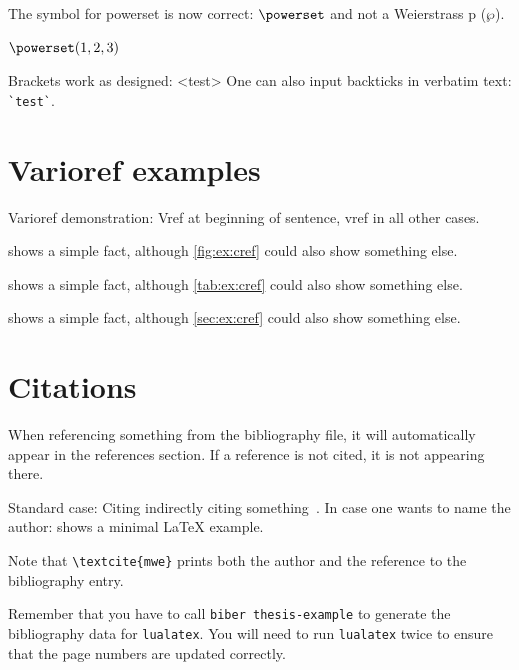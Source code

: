 \documentclass[
  fontsize=10pt,
  numbers=noenddot,
  english,  %
  paper=a5,
  twoside,  %
  DIV=calc,
  headings=small,
  bibliography=totoc,
  listof=totoc,
  draft=false
]{scrbook}
\theoremstyle{break}
\begin{document}
\begin{ltgexample}
The symbol for powerset is now correct: $\powerset$ and not a Weierstrass p ($\wp$).

$\powerset({1,2,3})$
\end{ltgexample}

\begin{ltgexample}
Brackets work as designed:
<test>
One can also input backticks in verbatim text: \verb|`test`|.
\end{ltgexample}


\section{Varioref examples}
\label{sec:ex:vref}

Varioref demonstration: Vref at beginning of sentence, vref in all other cases.

\begin{ltgexample}
 shows a simple fact, although \vref{fig:ex:cref} could also show something else.

 shows a simple fact, although \vref{tab:ex:cref} could also show something else.

 shows a simple fact, although \vref{sec:ex:cref} could also show something else.
\end{ltgexample}

\section{Citations}

When referencing something from the bibliography file, it will automatically appear in the references section.
If a reference is not cited, it is not appearing there.

\begin{ltgexample}
Standard case: Citing indirectly citing something~\cite{mwe}.
In case one wants to name the author: \textcite{mwe} shows a minimal \LaTeX{} example.
\end{ltgexample}

Note that \texttt{\textbackslash textcite\{mwe\}} prints both the author and the reference to the bibliography entry.

Remember that you have to call \texttt{biber thesis-example} to generate the bibliography data for \texttt{lualatex}.
You will need to run \texttt{lualatex} twice to ensure that the page numbers are updated correctly.
\end{document}
